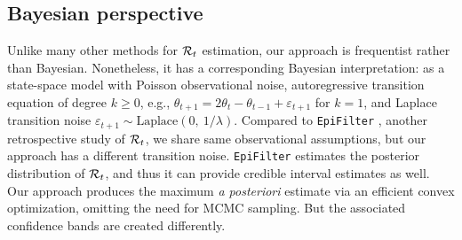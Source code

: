 

\subsection{Bayesian perspective}

Unlike many other methods for $\mathcal{R}_t$ estimation, our approach is frequentist
rather than Bayesian. Nonetheless, it has a corresponding Bayesian
interpretation: as a state-space model with Poisson observational noise,
autoregressive transition equation of degree $k\geq 0$, e.g., $\theta_{t+1} =
2\theta_t - \theta_{t-1} + \varepsilon_{t+1}$ for $k=1$, and Laplace transition
noise $\varepsilon_{t+1}\sim \mathrm{Laplace}(0,\ 1/\lambda)$. Compared to
\texttt{EpiFilter} \citep{parag2021improved}, another retrospective study of
$\mathcal{R}_t$, we share same observational assumptions, but our approach has a
different transition noise. \texttt{EpiFilter} estimates the posterior
distribution of
$\mathcal{R}_t$, and thus it can provide credible interval estimates as well. Our
approach produces the maximum \emph{a posteriori} estimate via an efficient
convex optimization, omitting the need for MCMC sampling. But the associated
confidence bands are created differently.
